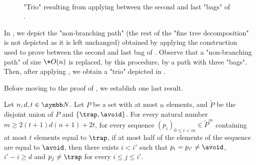 \begin{figure}[tbp]
	\centering
    \\[1em]
	\hfill
	\hfill
	\caption{
		\AP\label{fig:trio-result}
		"Trio" resulting from applying 
		between the second and last "bags" of .
	}
\end{figure}
In , we depict the "non-branching path" (the rest
of the "fine tree decomposition" is not depicted as it is left unchanged) obtained
by applying the construction used to prove 
between the second and last bag of . Observe that a "non-branching path" of size $\+O(n)$ is replaced, by this procedure, by a path with three "bags".
Then, after applying , we obtain a "trio"
depicted in .

Before moving to the proof of , we establish one last result.
\begin{fact}
    \AP\label{fact:pigeon-hole}
    Let $n, d, t \in \N$. Let $P$ be a set with at most $n$ elements,
    and $\tilde P$ be the disjoint union of $P$ and $\{\trap, \avoid\}$.
    For every natural number $m \geq 2(t+1)d(n+1) + 2t$, 
    for every sequence $(p_i)_{0 \leq i < m} \in \tilde P^m$ containing at most
    $t$ elements equal to $\trap$, if at most half of  the elements of the sequence
    are equal to $\avoid$, then there exists
    $i < i'$ such that $p_i = p_{i'} \neq \avoid$, $i' - i \geq d$ and
    $p_j \neq \trap$ for every $i \leq j \leq i'$.
\end{fact}

